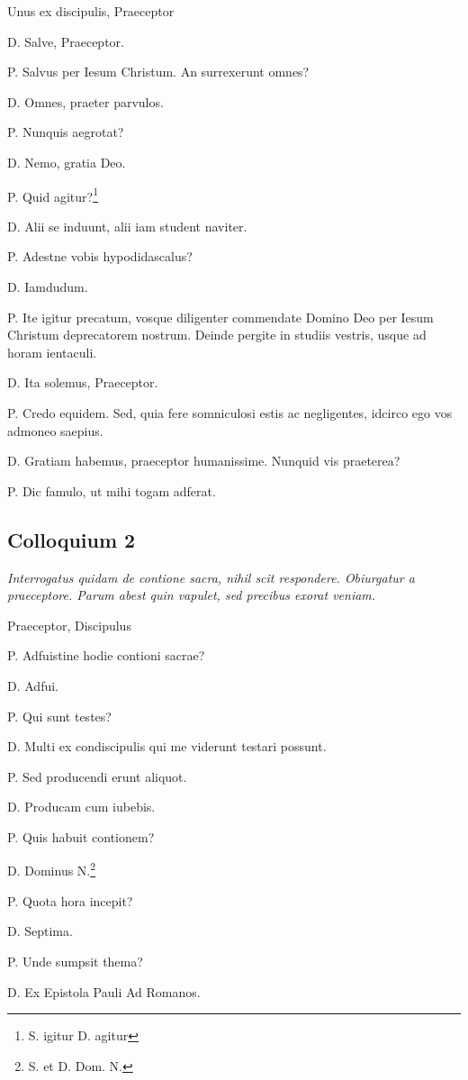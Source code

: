 \documentclass{article}
\begin{document}
Unus ex discipulis, Praeceptor

D. Salve, Praeceptor.

P. Salvus per Iesum Christum. An surrexerunt omnes?

D. Omnes, praeter parvulos.

P. Nunquis aegrotat?

D. Nemo, gratia Deo.

P. Quid agitur?\footnote{S. igitur D. agitur}

D. Alii se induunt, alii iam student naviter.

P. Adestne vobis hypodidascalus?

D. Iamdudum.

P. Ite igitur precatum, vosque diligenter commendate Domino Deo per Iesum Christum deprecatorem nostrum. Deinde pergite in studiis vestris, usque ad horam ientaculi.

D. Ita solemus, Praeceptor.

P. Credo equidem. Sed, quia fere somniculosi estis ac negligentes, idcirco ego vos admoneo saepius.

D. Gratiam habemus, praeceptor humanissime. Nunquid vis praeterea?

P. Dic famulo, ut mihi togam adferat.

\subsection{Colloquium 2}
\emph{Interrogatus quidam de contione sacra, nihil scit respondere. Obiurgatur a praeceptore. Parum abest quin vapulet, sed precibus exorat veniam.}

Praeceptor, Discipulus

P. Adfuistine hodie contioni sacrae?

D. Adfui.

P. Qui sunt testes?

D. Multi ex condiscipulis qui me viderunt testari possunt.

P. Sed producendi erunt aliquot.

D. Producam cum iubebis.

P. Quis habuit contionem?

D. Dominus N.\footnote{S. et D. Dom. N.}

P. Quota hora incepit?

D. Septima.

P. Unde sumpsit thema?

D. Ex Epistola Pauli Ad Romanos.
\end{document}
